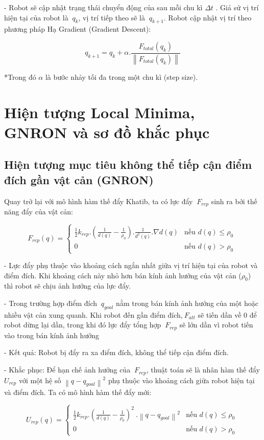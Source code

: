 \documentclass[12pt,a4paper,oneside]{report}
\begin{document}
- Robot sẽ cập nhật trạng thái chuyển động của sau mỗi chu kì \(\Delta t\) . Giả sử vị trí hiện tại của robot là \({\ q}_{k}\), vị trí tiếp theo sẽ là \({\ q}_{k + 1}\). Robot cập nhật vị trí theo phương pháp Hạ Gradient (Gradient Descent):

\[q_{k + 1} = q_{k} + \alpha.\frac{F_{total}(q_{k})}{\left\| F_{total}(q_{k}) \right\|}\]

*Trong đó \(\alpha\) là bước nhảy tối đa trong một chu kì (step size).

\section{Hiện tượng Local Minima, GNRON và sơ đồ khắc phục}

\subsection{Hiện tượng mục tiêu không thể tiếp cận điểm đích gần vật cản (GNRON)}

Quay trở lại với mô hình hàm thế đẩy Khatib, ta có lực đẩy \({\ F}_{rep}\) sinh ra bởi thế năng đẩy của vật cản:

\[F_{rep}(q) = \begin{cases}
\frac{1}{2}k_{rep}.\left( \frac{1}{d(q)} - \frac{1}{\rho_{0}} \right).\frac{1}{d^{2}(q)}.\nabla d(q) & \text{nếu } d(q) \leq \rho_{0} \\
0 & \text{nếu } d(q) > \rho_{0}
\end{cases}\ \]

- Lực đẩy phụ thuộc vào khoảng cách ngắn nhất giữa vị trí hiện tại của robot và điểm đích. Khi khoảng cách này nhỏ hơn bán kính ảnh hưởng của vật cản (\(\rho_{0}\)) thì robot sẽ chịu ảnh hưởng của lực đẩy.

- Trong trường hợp điểm đích \({\ q}_{goal}\) nằm trong bán kính ảnh hưởng của một hoặc nhiều vật cản xung quanh. Khi robot đến gần điểm đích,\({\ F}_{att}\) sẽ tiến dần về 0 để robot dừng lại dần, trong khi đó lực đẩy tổng hợp \({\ F}_{rep}\) sẽ lớn dần vì robot tiến vào trong bán kính ảnh hưởng

- Kết quả: Robot bị đẩy ra xa điểm đích, không thể tiếp cận điểm đích.

- Khắc phục: Để hạn chế ảnh hưởng của \({\ F}_{rep}\), thuật toán sẽ là nhân hàm thế đẩy \(U_{rep}\) với một hệ số \(\left\| q - q_{goal} \right\|^{2}\) phụ thuộc vào khoảng cách giữa robot hiện tại và điểm đích. Ta có mô hình hàm thế đẩy mới:

\[U_{rep}(q) = \begin{cases}
\frac{1}{2}k_{rep}.\left( \frac{1}{d(q)} - \frac{1}{\rho_{0}} \right)^{2}\ .\left\| q - q_{goal} \right\|^{2} & \text{nếu } d(q) \leq \rho_{0} \\
0 & \text{nếu } d(q) > \rho_{0}
\end{cases}\ \]
\end{document}
